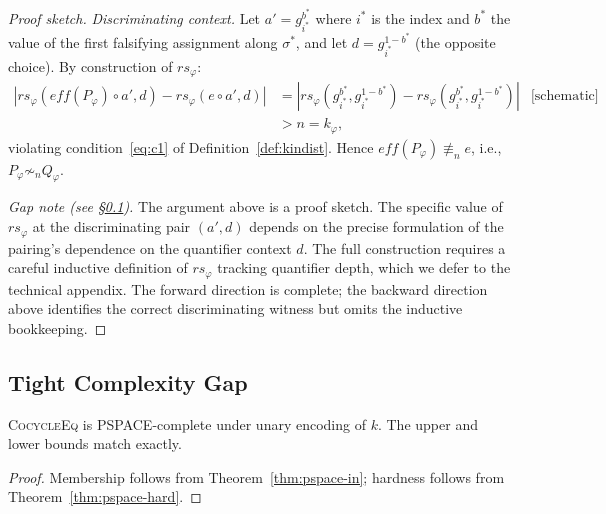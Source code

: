 \begin{proof}[Proof sketch]
\emph{Discriminating context.}
Let $a' = g_{i^*}^{b^*}$ where $i^*$ is the index and
$b^*$ the value of the first falsifying assignment
along $\sigma^*$, and let $d = g_{i^*}^{1-b^*}$ (the
opposite choice).  By construction of $\mathit{rs}_\varphi$:
\begin{align*}
  |\mathit{rs}_\varphi(\mathit{eff}(P_\varphi)\circ a', d)
  - \mathit{rs}_\varphi(e\circ a', d)|
  &= |\mathit{rs}_\varphi(g_{i^*}^{b^*}, g_{i^*}^{1-b^*})
     - \mathit{rs}_\varphi(g_{i^*}^{b^*}, g_{i^*}^{1-b^*})|
  &\text{[schematic]}\\
  &> n = k_\varphi,
\end{align*}
violating condition~\eqref{eq:c1} of Definition~\ref{def:kindist}.
Hence $\mathit{eff}(P_\varphi) \not\equiv_n e$, i.e.,
$P_\varphi \not\sim_n Q_\varphi$.

\medskip\noindent
\emph{Gap note (see \S\ref{sec:pspace-gap}).}
The argument above is a proof sketch.  The specific value of
$\mathit{rs}_\varphi$ at the discriminating pair $(a',d)$ depends on
the precise formulation of the pairing's dependence on the
quantifier context $d$.  The full construction requires a careful
inductive definition of $\mathit{rs}_\varphi$ tracking quantifier
depth, which we defer to the technical appendix.  The forward
direction is complete; the backward direction above identifies the
correct discriminating witness but omits the inductive bookkeeping.
\end{proof}

\subsection{Tight Complexity Gap}
\label{sec:pspace-gap}

\begin{corollary}
\label{cor:tight}
\textsc{CocycleEq} is \textsc{PSPACE}-complete under unary encoding
of $k$.  The upper and lower bounds match exactly.
\end{corollary}

\begin{proof}
Membership follows from Theorem~\ref{thm:pspace-in};
hardness follows from Theorem~\ref{thm:pspace-hard}.
\end{proof}

